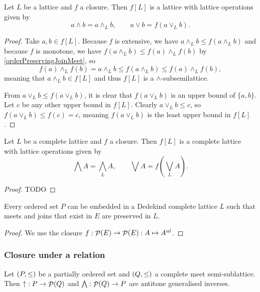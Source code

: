 \begin{proposition}
Let $L$ be a lattice and $f$ a closure. Then $f[L]$ is a lattice with lattice operations given by
\[ a\wedge b = a\wedge_L b, \qquad a\vee b = f(a\vee_L b). \]
\end{proposition}
\begin{proof}
Take $a,b\in f[L]$. Because $f$ is extensive, we have $a\wedge_L b \leq f(a\wedge_L b)$ and because $f$ is monotone, we have $f(a\wedge_L b)\leq f(a)\wedge_L f(b)$ by \ref{orderPreservingJoinMeet}, so
\[ f(a)\wedge_L f(b) = a\wedge_L b \leq f(a\wedge_L b) \leq f(a)\wedge_L f(b), \]
meaning that $a\wedge_L b \in f[L]$ and thus $f[L]$ is a $\wedge$-subsemilattice.

From $a\vee_L b \leq f(a\vee_L b)$, it is clear that $f(a\vee_L b)$ is an upper bound of $\{a,b\}$. Let $c$ be any other upper bound in $f[L]$. Clearly $a\vee_L b \leq c$, so $f(a\vee_L b) \leq f(c) = c$, meaning $f(a\vee_L b)$ is the least upper bound in $f[L]$.
\end{proof}
\begin{proposition}
Let $L$ be a complete lattice and $f$ a closure. Then $f[L]$ is a complete lattice with lattice operations given by
\[ \bigwedge A = {\bigwedge}_L A, \qquad \bigvee A = f({\bigvee}_L A). \]
\end{proposition}
\begin{proof}
TODO
\end{proof}

\begin{theorem}
Every ordered set $P$ can be embedded in a Dedekind complete lattice $L$ such that meets and joins that exist in $E$ are preserved in $L$.
\end{theorem}
\begin{proof}
We use the closure $f: \mathop{\mathcal{P}}(E) \to \mathop{\mathcal{P}}(E): A\mapsto A^{ul}$.
\end{proof}

\subsubsection{Closure under a relation}

\begin{proposition}
Let $\left( P, \leq \right)$ be a partially ordered set and $\left( Q, \leq \right)$ a complete meet semi-sublattice. Then $\mathop{\uparrow}: P \to \mathop{\mathcal{P}}(Q)$ and $\bigwedge: \mathop{\mathcal{P}}(Q) \to P$ are antitone generalised inverses. 
\end{proposition}


